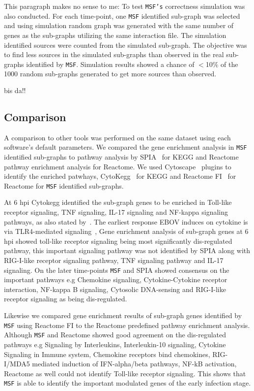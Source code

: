 \documentclass[10pt,a4paper,twocolumn]{article}
\newcommand{\TODO}[1]{\begingroup\color{red}#1\endgroup}
\begin{document}
 \TODO{This paragraph makes no sense to me:
 To test \texttt{MSF's} correctness simulation was also conducted. For each
 time-point, one \texttt{MSF} identified sub-graph was selected and using
 simulation random graph was generated with the same number of genes as the
 sub-graphs utilizing the same interaction file. The simulation identified
 sources were counted from the simulated sub-graph. The objective was to
 find less sources in the simulated sub-graphs than observed in the real
 sub-graphs identified by \texttt{MSF}. Simulation results showed a chance
 of $<$10$\%$ of the 1000 random sub-graphs generated to get more sources
 than observed.}


\TODO{bis da!!}

\subsection*{Comparison}

 A comparison to other tools was performed on the same dataset using each
 software's default parameters. We compared the gene enrichment analysis in
 \texttt{MSF} identified sub-graphs to pathway analysis by
 SPIA~\cite{Tarca} for KEGG and Reactome pathway enrichment analysis for
 Reactome.  We used Cytoscape~\cite{Cyto} plugins to identify the enriched
 patwhays, CytoKegg~\cite{Cytokegg} for KEGG and Reactome
 FI~\cite{Reactome} for Reactome for \texttt{MSF} identified sub-graphs.

At 6 hpi Cytokegg identified the sub-graph genes to be enriched in
Toll-like receptor signaling, TNF signaling, IL-17 signaling and NF-kappa
signaling pathways, as also stated by~\cite{Olejnik}. The earliest response
EBOV induces on cytokine is via TLR4-mediated signaling~\cite{Olejnik},
Gene enrichment analysis of sub-graph genes at 6 hpi showed toll-like
receptor signaling being most significantly dis-regulated pathway, this
important signaling pathway was not identified by SPIA along with
RIG-I-like receptor signaling pathway, TNF signaling pathway and IL-17
signaling. On the later time-points \texttt{MSF} and SPIA showed consensus
on the important pathways e.g Chemokine signaling, Cytokine-Cytokine
receptor interaction, NF-kappa B signaling, Cytosolic DNA-sensing and
RIG-I-like receptor signaling as being dis-regulated.

Likewise we compared gene enrichment results of sub-graph genes identified
by \texttt{MSF} using Reactome FI to the Reactome predefined pathway
enrichment analysis. Although \texttt{MSF} and Reactome showed good
agreement on the dis-regulated pathways e.g Signaling by Interleukins,
Interleukin-10 signaling, Cytokine Signaling in Immune system, Chemokine
receptors bind chemokines, RIG-I/MDA5 mediated induction of IFN-alpha/beta
pathways, NF-kB activation, Reactome as well could not identify Toll-like
receptor signaling. This shows that \texttt{MSF} is able to identify the
important modulated genes of the early infection stage.
\end{document}
